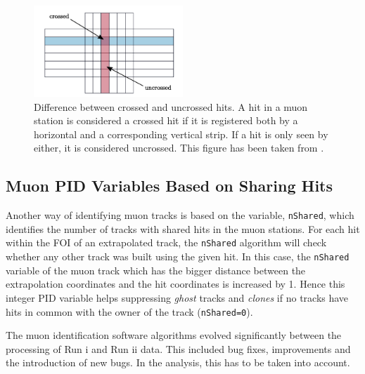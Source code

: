 \begin{figure}[!h]
        \centering
        \includegraphics[width = 0.5\textwidth]{figs/trimuon/crossedhits.pdf}
	\caption{Difference between crossed and uncrossed hits. A hit
in a muon station is considered a crossed hit if it is registered both by a
horizontal and a corresponding vertical strip. If a hit is only seen by either,
	it is considered uncrossed. This figure has been taken from \cite{Dungs:2015mml}.}
        \label{fig:pads}
\end{figure}


\subsection{Muon PID Variables Based on Sharing Hits }
\label{bugs}

Another way of identifying muon tracks is based on the variable, \texttt{nShared}, which identifies the number of tracks with shared hits in the muon stations. For each hit within the \gls{FOI} of an extrapolated track, the \texttt{nShared} algorithm will check whether any other track was built using the given hit. In this case, the \texttt{nShared} variable of the muon track which has the bigger distance between the extrapolation coordinates and the hit coordinates is increased by 1. Hence this integer \gls{PID} variable helps suppressing \textit{ghost} tracks and \textit{clones} if no tracks have hits in common with the owner of the track (\texttt{nShared=0}).

The muon identification software algorithms evolved significantly between the processing of Run \Rn{1} and Run \Rn{2} data. This included bug fixes, improvements and the introduction of new bugs. In the \Bmumumu analysis, this has to be taken into account.


